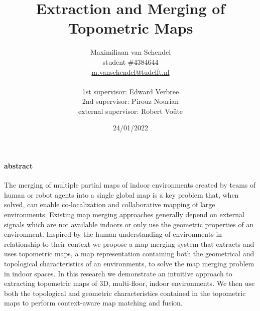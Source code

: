 \documentclass{article}
\title{Extraction and Merging of Topometric Maps}
\author{
  Maximiliaan van Schendel\\
  student \#4384644 \\
  \url{m.vanschendel@tudelft.nl}\\
  \\
  1st supervisor: Edward Verbree \\
  2nd supervisor: Pirouz Nourian \\
  external supervisor: Robert Voûte \\
}
\date{24/01/2022}
\begin{document}


\maketitle
\pagebreak

\tableofcontents
\newpage



\paragraph{abstract}
The merging of multiple partial \gls{map}s of indoor environments created by teams of human or robot agents into a single global map is a key problem that, when solved, can enable co-localization and collaborative mapping of large environments. Existing map merging approaches generally depend on external signals which are not available indoors or only use the  geometric properties of an environment. Inspired by the human understanding of environments in relationship to their context we propose a map merging system that extracts and uses topometric maps, a map representation containing both the geometrical and topological characteristics of an environments, to solve the map merging problem in indoor spaces. In this research we demonstrate an intuitive approach to extracting topometric maps of 3D, multi-floor, indoor environments. We then use both the topological and geometric characteristics contained in the topometric maps to perform context-aware map matching and fusion. 


\clearpage
\printnoidxglossaries



\pagebreak

\pagebreak

\pagebreak                                                     

\pagebreak





\end{document}
